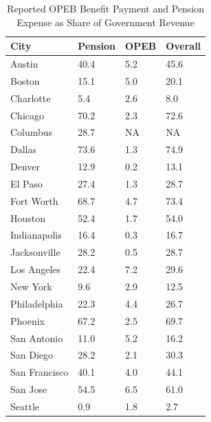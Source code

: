 \documentclass[12pt]{article}
\begin{document}
\begin{table}[h]
\centering
\caption{Reported OPEB Benefit Payment and Pension Expense as Share of Government Revenue}
\begin{tabular}{l|l|l|l}
\hline
         City 	&	   Pension 	&	 OPEB 	&	  Overall	\\	\hline
       Austin 	&	40.4	&	5.2	&	45.6	\\	\hline
       Boston 	&	15.1	&	5.0	&	20.1	\\	\hline
    Charlotte 	&	5.4	&	2.6	&	8.0	\\	\hline
      Chicago 	&	70.2	&	2.3	&	72.6	\\	\hline
     Columbus 	&	28.7	&	NA	&	NA	\\	\hline
       Dallas 	&	73.6	&	1.3	&	74.9	\\	\hline
       Denver 	&	12.9	&	0.2	&	13.1	\\	\hline
      El Paso 	&	27.4	&	1.3	&	28.7	\\	\hline
  Fort Worth  	&	68.7	&	4.7	&	73.4	\\	\hline
      Houston 	&	52.4	&	1.7	&	54.0	\\	\hline
 Indianapolis 	&	16.4	&	0.3	&	16.7	\\	\hline
 Jacksonville 	&	28.2	&	0.5	&	28.7	\\	\hline
  Los Angeles 	&	22.4	&	7.2	&	29.6	\\	\hline
    New York  	&	9.6	&	2.9	&	12.5	\\	\hline
 Philadelphia 	&	22.3	&	4.4	&	26.7	\\	\hline
      Phoenix 	&	67.2	&	2.5	&	69.7	\\	\hline
  San Antonio 	&	11.0	&	5.2	&	16.2	\\	\hline
    San Diego 	&	28.2	&	2.1	&	30.3	\\	\hline
San Francisco 	&	40.1	&	4.0	&	44.1	\\	\hline
     San Jose 	&	54.5	&	6.5	&	61.0	\\	\hline
      Seattle 	&	0.9	&	1.8	&	2.7	\\	\hline
\end{tabular}
\end{table}
\end{document}
